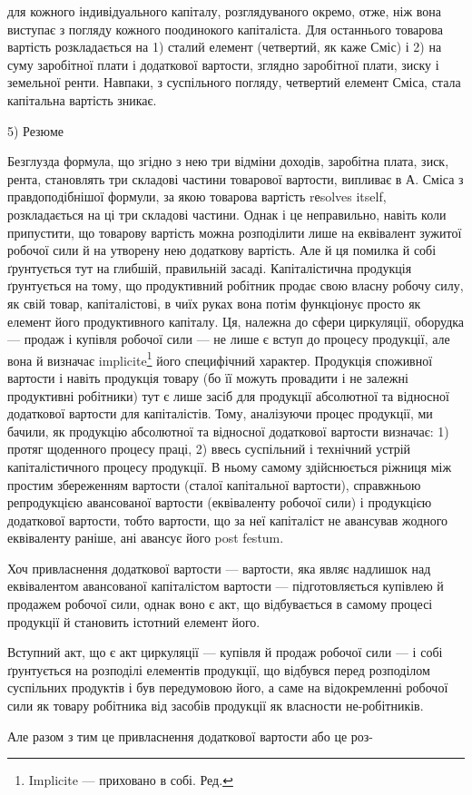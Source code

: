 для кожного індивідуального капіталу, розглядуваного окремо, отже, ніж
вона виступає з погляду кожного поодинокого капіталіста. Для останнього
товарова вартість розкладається на 1) сталий елемент (четвертий,
як каже Сміс) і 2) на суму заробітної плати і додаткової вартости, зглядно
заробітної плати, зиску і земельної ренти. Навпаки, з суспільного погляду,
четвертий елемент Сміса, стала капітальна вартість зникає.

5) Резюме

Безглузда формула, що згідно з нею три відміни доходів, заробітна
плата, зиск, рента, становлять три складові частини товарової вартости,
випливає в А. Сміса з правдоподібнішої формули, за якою товарова
вартість rеsolves itself, розкладається на ці три складові частини. Однак
і це неправильно, навіть коли припустити, що товарову вартість можна
розподілити лише на еквівалент зужитої робочої сили й на утворену
нею додаткову вартість. Але й ця помилка й собі ґрунтується тут на
глибшій, правильній засаді. Капіталістична продукція ґрунтується на тому,
що продуктивний робітник продає свою власну робочу силу, як свій
товар, капіталістові, в чиїх руках вона потім функціонує просто як елемент
його продуктивного капіталу. Ця, належна до сфери циркуляції,
оборудка — продаж і купівля робочої сили — не лише є вступ до процесу
продукції, але вона й визначає implicite\footnote*{
Implicite — приховано в собі. Ред.
} його специфічний характер.
Продукція споживної вартости і навіть продукція товару (бо її можуть
провадити і не залежні продуктивні робітники) тут є лише засіб для продукції
абсолютної та відносної додаткової вартости для капіталістів. Тому, аналізуючи
процес продукції, ми бачили, як продукцію абсолютної та відносної
додаткової вартости визначає: 1) протяг щоденного процесу праці,
2) ввесь суспільний і технічний устрій капіталістичного процесу продукції.
В ньому самому здійснюється ріжниця між простим збереженням вартости
(сталої капітальної вартости), справжньою репродукцією авансованої вартости
(еквіваленту робочої сили) і продукцією додаткової вартости, тобто
вартости, що за неї капіталіст не авансував жодного еквіваленту раніше,
ані авансує його post festum.

Хоч привласнення додаткової вартости — вартости, яка являє надлишок
над еквівалентом авансованої капіталістом вартости — підготовляється
купівлею й продажем робочої сили, однак воно є акт, що відбувається
в самому процесі продукції й становить істотний елемент його.

Вступний акт, що є акт циркуляції — купівля й продаж робочої сили — і
собі ґрунтується на розподілі елементів продукції, що відбувся перед
розподілом суспільних продуктів і був передумовою його, а саме на
відокремленні робочої сили як товару робітника від засобів продукції
як власности не-робітників.

Але разом з тим це привласнення додаткової вартости або це роз-